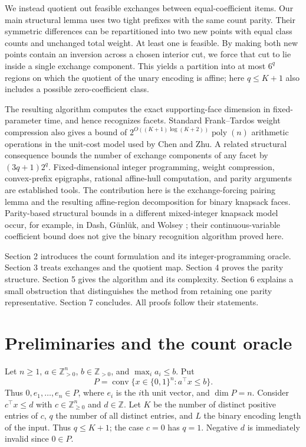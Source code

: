 \documentclass[11pt]{article}
\newcommand{\Z}{\mathbb Z}\newcommand{\R}{\mathbb R}
\begin{document}
We instead quotient out feasible exchanges between equal-coefficient items. Our main structural lemma uses two tight prefixes with the same count parity. Their symmetric differences can be repartitioned into two new points with equal class counts and unchanged total weight. At least one is feasible. By making both new points contain an inversion across a chosen interior cut, we force that cut to lie inside a single exchange component. This yields a partition into at most $6^q$ regions on which the quotient of the unary encoding is affine; here $q\le K+1$ also includes a possible zero-coefficient class.

The resulting algorithm computes the exact supporting-face dimension in fixed-parameter time, and hence recognizes facets. Standard Frank--Tardos weight compression also gives a bound of $2^{O((K+1)\log(K+2))}\operatorname{poly}(n)$ arithmetic operations in the unit-cost model used by Chen and Zhu. A related structural consequence bounds the number of exchange components of any facet by $(3q+1)2^q$. Fixed-dimensional integer programming, weight compression, convex-prefix epigraphs, rational affine-hull computation, and parity arguments are established tools. The contribution here is the exchange-forcing pairing lemma and the resulting affine-region decomposition for binary knapsack faces. Parity-based structural bounds in a different mixed-integer knapsack model occur, for example, in Dash, G\"unl\"uk, and Wolsey \cite{DGW}; their continuous-variable coefficient bound does not give the binary recognition algorithm proved here.

Section 2 introduces the count formulation and its integer-programming oracle. Section 3 treats exchanges and the quotient map. Section 4 proves the parity structure. Section 5 gives the algorithm and its complexity. Section 6 explains a small obstruction that distinguishes the method from retaining one parity representative. Section 7 concludes. All proofs follow their statements.

\section{Preliminaries and the count oracle}
Let $n\ge1$, $a\in\Z_{>0}^n$, $b\in\Z_{>0}$, and $\max_i a_i\le b$. Put
\[
 P=\operatorname{conv}\{x\in\{0,1\}^n:a^\top x\le b\}.
\]
Thus $0,e_1,\ldots,e_n\in P$, where $e_i$ is the $i$th unit vector, and $\dim P=n$. Consider $c^\top x\le d$ with $c\in\Z_{\ge0}^n$ and $d\in\Z$. Let $K$ be the number of distinct positive entries of $c$, $q$ the number of all distinct entries, and $L$ the binary encoding length of the input. Thus $q\le K+1$; the case $c=0$ has $q=1$. Negative $d$ is immediately invalid since $0\in P$.
\end{document}
